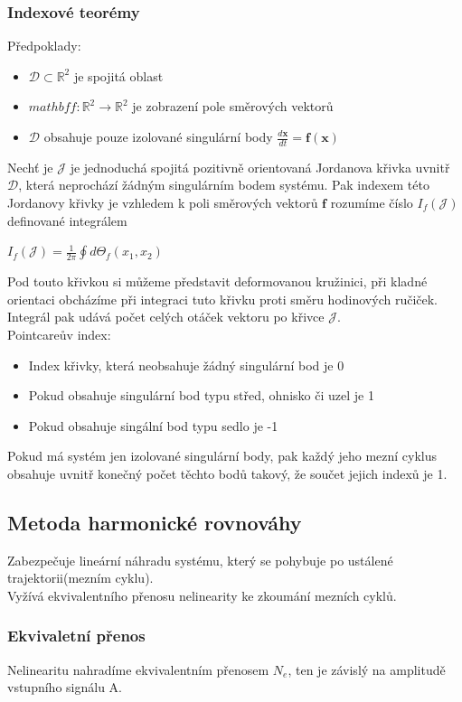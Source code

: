 \subsubsection*{Indexové teorémy}
Předpoklady:
\begin{itemize}
    \item \(\mathcal{D} \subset \mathbb{R}^2 \) je spojitá oblast
    \item \(mathbf{f}: \mathbb{R}^2 \rightarrow \mathbb{R}^2\) je zobrazení pole směrových vektorů
    \item \(\mathcal{D}\) obsahuje pouze izolované singulární body \(\frac{d\mathbf{x}}{dt} = \mathbf{f}(\mathbf{x})\)
\end{itemize}
Nechť je \(\mathcal{J}\) je jednoduchá spojitá pozitivně orientovaná Jordanova křivka uvnitř \(\mathcal{D}\), která neprochází žádným singulárním bodem systému. Pak indexem této Jordanovy křivky je vzhledem k poli směrových vektorů \(\mathbf{f}\) rozumíme číslo \(I_f(\mathcal{J})\) definované integrálem
\begin{center}
    \(I_f(\mathcal{J}) = \frac{1}{2\pi} \oint d\Theta_f(x_1,x_2)\)
\end{center}
Pod touto křivkou si můžeme představit deformovanou kružinici, při kladné orientaci obcházíme při integraci tuto křivku proti směru hodinových ručiček. Integrál pak udává počet celých otáček vektoru po křivce  \(\mathcal{J}\).\\
Pointcareův index:
\begin{itemize}
    \item Index křivky, která neobsahuje žádný singulární bod je 0
    \item Pokud obsahuje singulární bod typu střed, ohnisko či uzel je 1
    \item Pokud obsahuje singální bod typu sedlo je -1
\end{itemize}
Pokud má systém jen izolované singulární body, pak každý jeho mezní cyklus obsahuje uvnitř konečný počet těchto bodů takový, že součet jejich indexů je 1.\\
\subsection{Metoda harmonické rovnováhy}
Zabezpečuje lineární náhradu systému, který se pohybuje po ustálené trajektorii(mezním cyklu).\\
Vyžívá ekvivalentního přenosu nelinearity ke zkoumání mezních cyklů.

\subsubsection*{Ekvivaletní přenos}
Nelinearitu nahradíme ekvivalentním přenosem $N_e$, ten je závislý na amplitudě vstupního signálu A.


